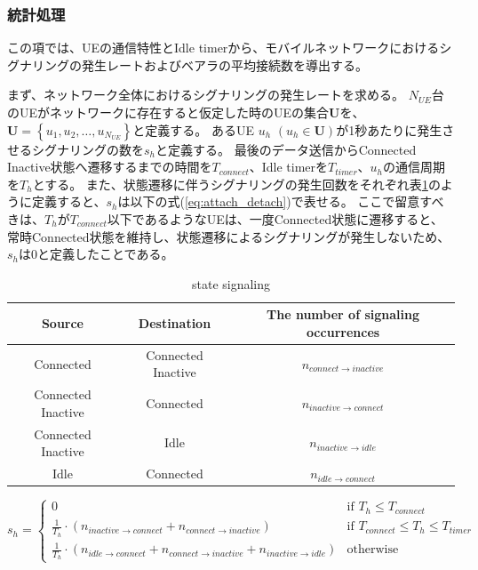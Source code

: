 \documentclass[a4j]{ujarticle}
\begin{document}
\subsubsection{統計処理}
この項では、UEの通信特性とIdle timerから、モバイルネットワークにおけるシグナリングの発生レートおよびベアラの平均接続数を導出する。

まず、ネットワーク全体におけるシグナリングの発生レートを求める。
$N_{UE}$台のUEがネットワークに存在すると仮定した時のUEの集合$\bm{U}$を、$\bm{U} = \left\{ u_1,u_2,\ldots,u_{N_{UE}} \right\}$と定義する。
あるUE $u_h$ $(u_h \in \bm{U})$が1秒あたりに発生させるシグナリングの数を$s_h$と定義する。
最後のデータ送信からConnected Inactive状態へ遷移するまでの時間を$T_{connect}$、Idle timerを$T_{timer}$、$u_h$の通信周期を$T_h$とする。
また、状態遷移に伴うシグナリングの発生回数をそれぞれ表\ref{table:state}のように定義すると、$s_h$は以下の式(\ref{eq:attach_detach})で表せる。
ここで留意すべきは、$T_h$が$T_{connect}$以下であるようなUEは、一度Connected状態に遷移すると、常時Connected状態を維持し、状態遷移によるシグナリングが発生しないため、$s_h$は0と定義したことである。
\begin{table}[h]
 \caption{state signaling}
 \label{table:state}
 \centering
  \begin{tabular}{ccc}
   \hline
   Source & Destination & The number of signaling occurrences \\
   \hline \hline
   Connected & Connected Inactive & $n_{connect \to inactive}$ \\
   Connected Inactive & Connected & $n_{inactive \to connect}$ \\
   Connected Inactive & Idle & $n_{inactive \to idle}$ \\
   Idle & Connected  & $n_{idle \to connect}$ \\
   \hline
  \end{tabular}
\end{table}

\begin{equation}
  s_h  =
  \begin{cases}
		0 & \text{if $T_h \le T_{connect}$} \\
    \frac{1}{T_h} \cdot (n_{inactive \to connect} + n_{connect \to inactive}) & \text{if $T_{connect} \le T_h \le T_{timer}$} \\
    \frac{1}{T_h} \cdot (n_{idle \to connect} + n_{connect \to inactive} + n_{inactive \to idle}) & \text{otherwise}
  \end{cases}
  \label{eq:attach_detach}
\end{equation}
\end{document}
